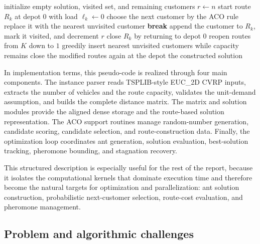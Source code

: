 \begin{algorithm}[H]
\caption{Simplified feasible ant construction}
\footnotesize
\begin{algorithmic}[1]
    \State initialize empty solution, visited set, and remaining customers $r \leftarrow n$
        \State start route $R_k$ at depot $0$ with load $\ell_k \leftarrow 0$
            \State choose the next customer by the ACO rule
                \State replace it with the nearest unvisited customer
            \EndIf
                \State \textbf{break}
            \EndIf
            \State append the customer to $R_k$, mark it visited, and decrement $r$
        \EndWhile
        \State close $R_k$ by returning to depot $0$
    \EndFor
        \State reopen routes from $K$ down to $1$
        \State greedily insert nearest unvisited customers while capacity remains
        \State close the modified routes again at the depot
    \EndIf
    \State \Return the constructed solution
\EndFunction
\end{algorithmic}
\normalsize
\end{algorithm}

In implementation terms, this pseudo-code is realized through four main components. The instance parser reads TSPLIB-style EUC\_2D CVRP inputs, extracts the number of vehicles and the route capacity, validates the unit-demand assumption, and builds the complete distance matrix. The matrix and solution modules provide the aligned dense storage and the route-based solution representation. The ACO support routines manage random-number generation, candidate scoring, candidate selection, and route-construction data. Finally, the optimization loop coordinates ant generation, solution evaluation, best-solution tracking, pheromone bounding, and stagnation recovery.

This structured description is especially useful for the rest of the report, because it isolates the computational kernels that dominate execution time and therefore become the natural targets for optimization and parallelization: ant solution construction, probabilistic next-customer selection, route-cost evaluation, and pheromone management.
\subsection{Problem and algorithmic challenges}

